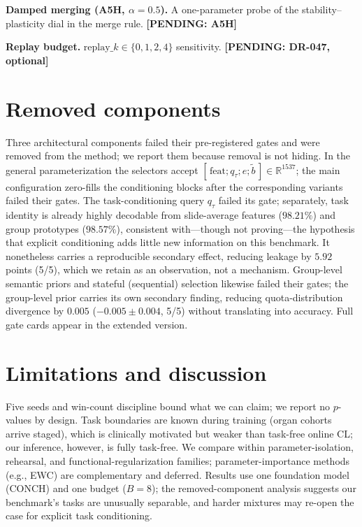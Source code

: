 \documentclass{article}
\newcommand{\pending}[1]{\textbf{[PENDING: #1]}}
\begin{document}
\textbf{Damped merging (A5H, $\alpha{=}0.5$).} A one-parameter probe of the stability--plasticity dial in the merge rule. \pending{A5H}

\textbf{Replay budget.} $\mathrm{replay}\_k\in\{0,1,2,4\}$ sensitivity. \pending{DR-047, optional}

\section{Removed components}
\label{sec:removed}
Three architectural components failed their pre-registered gates and were removed from the method; we report them because removal is not hiding. In the general parameterization the selectors accept $[\,\mathrm{feat};q_\tau;e;\tilde b\,]\in\mathbb{R}^{1537}$; the main configuration zero-fills the conditioning blocks after the corresponding variants failed their gates. The task-conditioning query $q_\tau$ failed its gate; separately, task identity is already highly decodable from slide-average features ($98.21\%$) and group prototypes ($98.57\%$), consistent with---though not proving---the hypothesis that explicit conditioning adds little new information on this benchmark. It nonetheless carries a reproducible secondary effect, reducing leakage by $5.92$ points (5/5), which we retain as an observation, not a mechanism. Group-level semantic priors and stateful (sequential) selection likewise failed their gates; the group-level prior carries its own secondary finding, reducing quota-distribution divergence by $0.005$ ($-0.005{\pm}0.004$, 5/5) without translating into accuracy. Full gate cards appear in the extended version.

\section{Limitations and discussion}
\label{sec:limitations}
Five seeds and win-count discipline bound what we can claim; we report no $p$-values by design. Task boundaries are known during training (organ cohorts arrive staged), which is clinically motivated but weaker than task-free online CL; our inference, however, is fully task-free. We compare within parameter-isolation, rehearsal, and functional-regularization families; parameter-importance methods (e.g., EWC) are complementary and deferred. Results use one foundation model (CONCH) and one budget ($B{=}8$); the removed-component analysis suggests our benchmark's tasks are unusually separable, and harder mixtures may re-open the case for explicit task conditioning.
\end{document}
